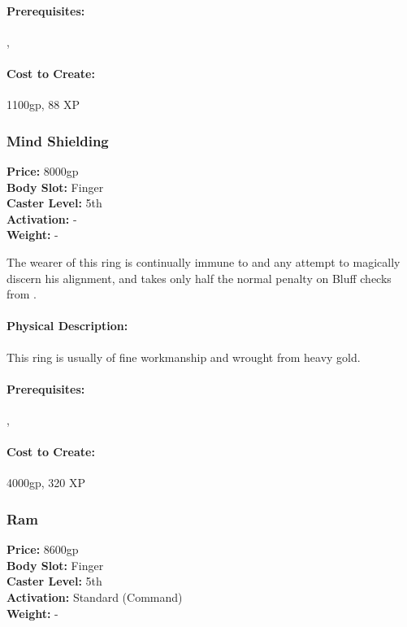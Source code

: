 \paragraph{Prerequisites:} , 

\paragraph{Cost to Create:} 1100gp, 88 XP
\subsubsection{Mind Shielding}
\label{Item:MindShielding}
   \textbf{Price:} 8000gp
\\ \textbf{Body Slot:} Finger
\\ \textbf{Caster Level:} 5th
\\ \textbf{Activation:} -
\\ \textbf{Weight:} -

The wearer of this ring is continually immune to  and any attempt to magically discern his alignment, and takes only half the normal penalty on Bluff checks from .

\paragraph{Physical Description:} This ring is usually of fine workmanship and wrought from heavy gold.

\paragraph{Prerequisites:} , 

\paragraph{Cost to Create:} 4000gp, 320 XP
\subsubsection{Ram}
\label{Item:Ram}
   \textbf{Price:} 8600gp
\\ \textbf{Body Slot:} Finger
\\ \textbf{Caster Level:} 5th
\\ \textbf{Activation:} Standard (Command)
\\ \textbf{Weight:} -

